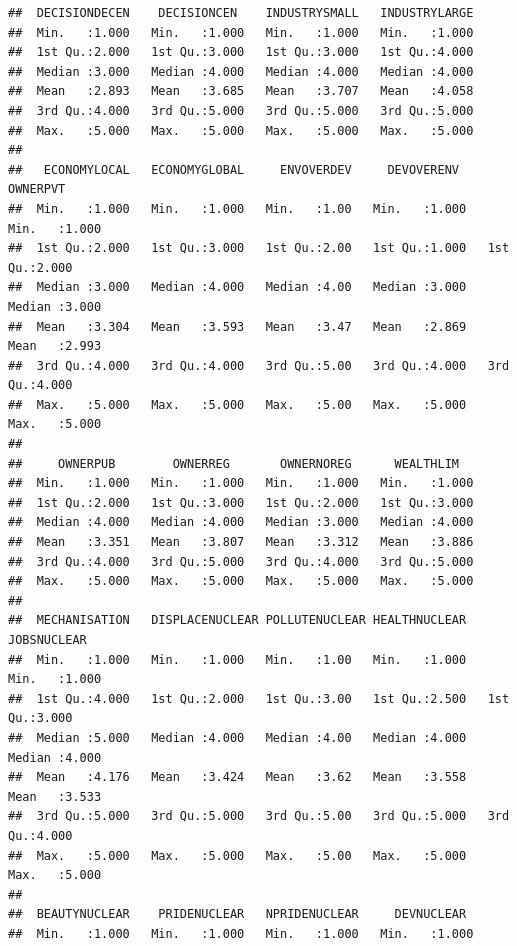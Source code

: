 \documentclass[
]{article}
\begin{document}
\begin{verbatim}
##  DECISIONDECEN    DECISIONCEN    INDUSTRYSMALL   INDUSTRYLARGE  
##  Min.   :1.000   Min.   :1.000   Min.   :1.000   Min.   :1.000  
##  1st Qu.:2.000   1st Qu.:3.000   1st Qu.:3.000   1st Qu.:4.000  
##  Median :3.000   Median :4.000   Median :4.000   Median :4.000  
##  Mean   :2.893   Mean   :3.685   Mean   :3.707   Mean   :4.058  
##  3rd Qu.:4.000   3rd Qu.:5.000   3rd Qu.:5.000   3rd Qu.:5.000  
##  Max.   :5.000   Max.   :5.000   Max.   :5.000   Max.   :5.000  
##                                                                 
##   ECONOMYLOCAL   ECONOMYGLOBAL     ENVOVERDEV     DEVOVERENV       OWNERPVT    
##  Min.   :1.000   Min.   :1.000   Min.   :1.00   Min.   :1.000   Min.   :1.000  
##  1st Qu.:2.000   1st Qu.:3.000   1st Qu.:2.00   1st Qu.:1.000   1st Qu.:2.000  
##  Median :3.000   Median :4.000   Median :4.00   Median :3.000   Median :3.000  
##  Mean   :3.304   Mean   :3.593   Mean   :3.47   Mean   :2.869   Mean   :2.993  
##  3rd Qu.:4.000   3rd Qu.:4.000   3rd Qu.:5.00   3rd Qu.:4.000   3rd Qu.:4.000  
##  Max.   :5.000   Max.   :5.000   Max.   :5.00   Max.   :5.000   Max.   :5.000  
##                                                                                
##     OWNERPUB        OWNERREG       OWNERNOREG      WEALTHLIM    
##  Min.   :1.000   Min.   :1.000   Min.   :1.000   Min.   :1.000  
##  1st Qu.:2.000   1st Qu.:3.000   1st Qu.:2.000   1st Qu.:3.000  
##  Median :4.000   Median :4.000   Median :3.000   Median :4.000  
##  Mean   :3.351   Mean   :3.807   Mean   :3.312   Mean   :3.886  
##  3rd Qu.:4.000   3rd Qu.:5.000   3rd Qu.:4.000   3rd Qu.:5.000  
##  Max.   :5.000   Max.   :5.000   Max.   :5.000   Max.   :5.000  
##                                                                 
##  MECHANISATION   DISPLACENUCLEAR POLLUTENUCLEAR HEALTHNUCLEAR    JOBSNUCLEAR   
##  Min.   :1.000   Min.   :1.000   Min.   :1.00   Min.   :1.000   Min.   :1.000  
##  1st Qu.:4.000   1st Qu.:2.000   1st Qu.:3.00   1st Qu.:2.500   1st Qu.:3.000  
##  Median :5.000   Median :4.000   Median :4.00   Median :4.000   Median :4.000  
##  Mean   :4.176   Mean   :3.424   Mean   :3.62   Mean   :3.558   Mean   :3.533  
##  3rd Qu.:5.000   3rd Qu.:5.000   3rd Qu.:5.00   3rd Qu.:5.000   3rd Qu.:4.000  
##  Max.   :5.000   Max.   :5.000   Max.   :5.00   Max.   :5.000   Max.   :5.000  
##                                                                                
##  BEAUTYNUCLEAR    PRIDENUCLEAR   NPRIDENUCLEAR     DEVNUCLEAR   
##  Min.   :1.000   Min.   :1.000   Min.   :1.000   Min.   :1.000  

\end{verbatim}
\end{document}
